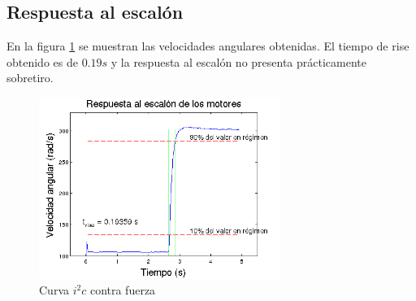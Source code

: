 \documentclass[main]{subfiles}
\begin{document}
\subsection{Respuesta al escal\'on}

En la figura \ref{fig:resp_esc} se muestran las velocidades angulares obtenidas. El tiempo de rise obtenido es de $0.19s$ y la respuesta al escal\'on no presenta pr\'acticamente sobretiro.


\begin{figure}
  \begin{center}
	\includegraphics[width=0.7\textwidth]{./pics_motores/resp_esc.png}
  \end{center}
  \caption{Curva $i^2c$ contra fuerza}
  \label{fig:resp_esc}
\end{figure}
\end{document}
